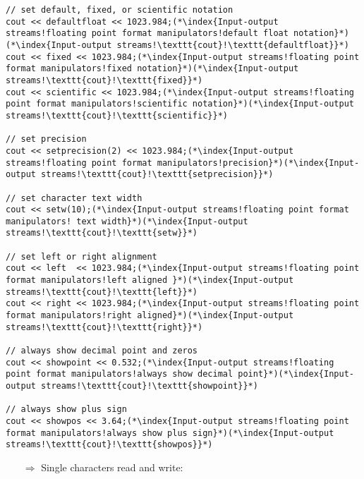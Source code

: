 \documentclass[10pt]{book}
\begin{document}
\begin{lstlisting}
// set default, fixed, or scientific notation
cout << defaultfloat << 1023.984;(*\index{Input-output streams!floating point format manipulators!default float notation}*)(*\index{Input-output streams!\texttt{cout}!\texttt{defaultfloat}}*)
cout << fixed << 1023.984;(*\index{Input-output streams!floating point format manipulators!fixed notation}*)(*\index{Input-output streams!\texttt{cout}!\texttt{fixed}}*)
cout << scientific << 1023.984;(*\index{Input-output streams!floating point format manipulators!scientific notation}*)(*\index{Input-output streams!\texttt{cout}!\texttt{scientific}}*)

// set precision
cout << setprecision(2) << 1023.984;(*\index{Input-output streams!floating point format manipulators!precision}*)(*\index{Input-output streams!\texttt{cout}!\texttt{setprecision}}*)

// set character text width
cout << setw(10);(*\index{Input-output streams!floating point format manipulators! text width}*)(*\index{Input-output streams!\texttt{cout}!\texttt{setw}}*)

// set left or right alignment
cout << left  << 1023.984;(*\index{Input-output streams!floating point format manipulators!left aligned }*)(*\index{Input-output streams!\texttt{cout}!\texttt{left}}*)
cout << right << 1023.984;(*\index{Input-output streams!floating point format manipulators!right aligned}*)(*\index{Input-output streams!\texttt{cout}!\texttt{right}}*)

// always show decimal point and zeros
cout << showpoint << 0.532;(*\index{Input-output streams!floating point format manipulators!always show decimal point}*)(*\index{Input-output streams!\texttt{cout}!\texttt{showpoint}}*)

// always show plus sign
cout << showpos << 3.64;(*\index{Input-output streams!floating point format manipulators!always show plus sign}*)(*\index{Input-output streams!\texttt{cout}!\texttt{showpos}}*)
\end{lstlisting}
\begin{enumerate}
\item[$\Rightarrow$] Single characters read and write:
\end{enumerate}
\end{document}
